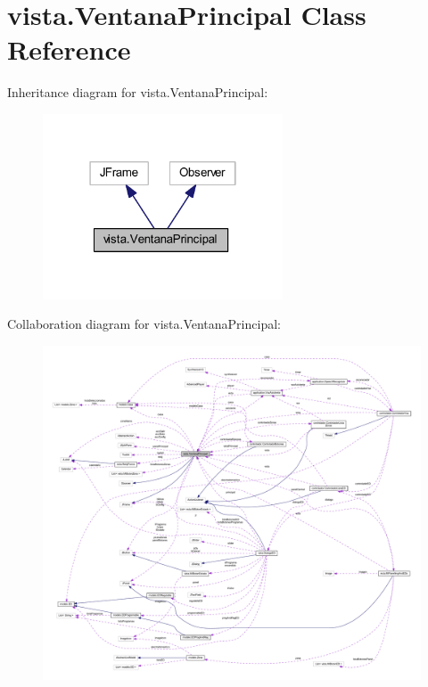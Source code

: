 \hypertarget{classvista_1_1_ventana_principal}{}\section{vista.\+Ventana\+Principal Class Reference}
\label{classvista_1_1_ventana_principal}


Inheritance diagram for vista.\+Ventana\+Principal\+:
\nopagebreak
\begin{figure}[H]
\begin{center}
\leavevmode
\includegraphics[width=202pt]{classvista_1_1_ventana_principal__inherit__graph}
\end{center}
\end{figure}


Collaboration diagram for vista.\+Ventana\+Principal\+:
\nopagebreak
\begin{figure}[H]
\begin{center}
\leavevmode
\includegraphics[width=350pt]{classvista_1_1_ventana_principal__coll__graph}
\end{center}
\end{figure}
